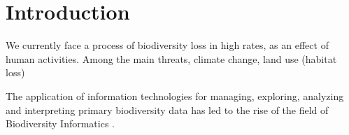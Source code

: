 \chapter{Introduction}\label{introduction}

We currently face a process of biodiversity loss in high rates, as an effect of human activities.
Among the main threats, climate change, land use (habitat loss)


The application of information technologies for managing, exploring, analyzing and interpreting primary biodiversity data has led to the rise of the field of Biodiversity Informatics \cite{Soberon2004}.





